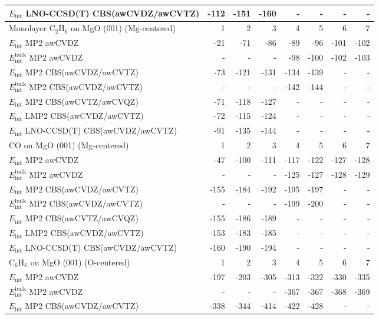 \begin{longtable}{lrrrrrrr}
$E_\textrm{int}$ LNO-CCSD(T) CBS(awCVDZ/awCVTZ) & -112 & -151 & -160 & - & - & - & - \\
\toprule
Monolayer C$_2$H$_6$ on MgO (001) (Mg-centered) & 1 & 2 & 3 & 4 & 5 & 6 & 7 \\ 
\midrule
$E_\textrm{int}$ MP2 awCVDZ & -21 & -71 & -86 & -89 & -96 & -101 & -102 \\
$E_\textrm{int}^\textrm{bulk}$ MP2 awCVDZ & - & - & - & -98 & -100 & -102 & -103 \\
$E_\textrm{int}$ MP2 CBS(awCVDZ/awCVTZ) & -73 & -121 & -131 & -134 & -139 & - & - \\
$E_\textrm{int}^\textrm{bulk}$ MP2 CBS(awCVDZ/awCVTZ) & - & - & - & -142 & -144 & - & - \\
$E_\textrm{int}$ MP2 CBS(awCVTZ/awCVQZ) & -71 & -118 & -127 & - & - & - & - \\
$E_\textrm{int}$ LMP2 CBS(awCVDZ/awCVTZ) & -72 & -115 & -124 & - & - & - & - \\
$E_\textrm{int}$ LNO-CCSD(T) CBS(awCVDZ/awCVTZ) & -91 & -135 & -144 & - & - & - & - \\
\toprule
CO on MgO (001) (Mg-centered) & 1 & 2 & 3 & 4 & 5 & 6 & 7 \\ 
\midrule
$E_\textrm{int}$ MP2 awCVDZ & -47 & -100 & -111 & -117 & -122 & -127 & -128 \\
$E_\textrm{int}^\textrm{bulk}$ MP2 awCVDZ & - & - & - & -125 & -127 & -128 & -129 \\
$E_\textrm{int}$ MP2 CBS(awCVDZ/awCVTZ) & -155 & -184 & -192 & -195 & -197 & - & - \\
$E_\textrm{int}^\textrm{bulk}$ MP2 CBS(awCVDZ/awCVTZ) & - & - & - & -199 & -200 & - & - \\
$E_\textrm{int}$ MP2 CBS(awCVTZ/awCVQZ) & -155 & -186 & -189 & - & - & - & - \\
$E_\textrm{int}$ LMP2 CBS(awCVDZ/awCVTZ) & -153 & -183 & -185 & - & - & - & - \\
$E_\textrm{int}$ LNO-CCSD(T) CBS(awCVDZ/awCVTZ) & -160 & -190 & -194 & - & - & - & - \\
\toprule
C$_6$H$_6$ on MgO (001) (O-centered) & 1 & 2 & 3 & 4 & 5 & 6 & 7 \\ 
\midrule
$E_\textrm{int}$ MP2 awCVDZ & -197 & -203 & -305 & -313 & -322 & -330 & -335 \\
$E_\textrm{int}^\textrm{bulk}$ MP2 awCVDZ & - & - & - & -367 & -367 & -368 & -369 \\
$E_\textrm{int}$ MP2 CBS(awCVDZ/awCVTZ) & -338 & -344 & -414 & -422 & -428 & - & - \\

\end{longtable}
